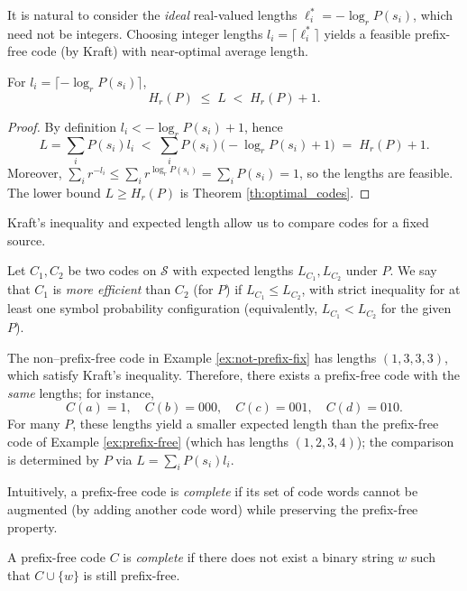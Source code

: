 It is natural to consider the \emph{ideal} real-valued lengths $\ell_i^\ast=-\log_r P(s_i)$, which need not be integers. Choosing integer lengths $l_i=\lceil \ell_i^\ast\rceil$ yields a feasible prefix-free code (by Kraft) with near-optimal average length.

\begin{proposition}
For $l_i=\lceil -\log_r P(s_i)\rceil$,
\[
H_r(P) \;\le\; L \;<\; H_r(P)+1.
\]
\end{proposition}
\begin{proof}
By definition $l_i< -\log_r P(s_i)+1$, hence
\[
L=\sum_i P(s_i)l_i \;<\; \sum_i P(s_i)\big(-\log_r P(s_i)+1\big) \;=\; H_r(P)+1.
\]
Moreover, $\sum_i r^{-l_i}\le \sum_i r^{\log_r P(s_i)}=\sum_i P(s_i)=1$, so the lengths are feasible. The lower bound $L\ge H_r(P)$ is Theorem \ref{th:optimal_codes}.
\end{proof}

Kraft's inequality and expected length allow us to compare codes for a fixed source.

\begin{definition}
Let $C_1,C_2$ be two codes on $\mathcal{S}$ with expected lengths $L_{C_1},L_{C_2}$ under $P$. We say that $C_1$ is \emph{more efficient} than $C_2$ (for $P$) if $L_{C_1}\le L_{C_2}$, with strict inequality for at least one symbol probability configuration (equivalently, $L_{C_1}<L_{C_2}$ for the given $P$).
\end{definition}

\begin{example}
The non–prefix-free code in Example \ref{ex:not-prefix-fix} has lengths $(1,3,3,3)$, which satisfy Kraft's inequality. Therefore, there exists a prefix-free code with the \emph{same} lengths; for instance,
\[
C(a)=1,\quad C(b)=000,\quad C(c)=001,\quad C(d)=010.
\]
For many $P$, these lengths yield a smaller expected length than the prefix-free code of Example \ref{ex:prefix-free} (which has lengths $(1,2,3,4)$); the comparison is determined by $P$ via $L=\sum_i P(s_i)l_i$.
\end{example}

Intuitively, a prefix-free code is \emph{complete} if its set of code words cannot be augmented (by adding another code word) while preserving the prefix-free property.

\begin{definition}
A prefix-free code $C$ is \emph{complete} if there does not exist a binary string $w$ such that $C\cup\{w\}$ is still prefix-free.
\end{definition}

